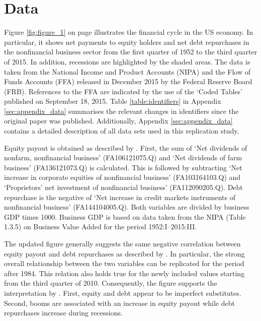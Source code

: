 \section{Data}
\label{sec:data}



Figure \ref{fig:figure_1} on page \pageref{fig:figure_1} illustrates the financial cycle in the US economy. In particular, it shows net payments to equity holders and net debt repurchases in the nonfinancial business sector from the first quarter of 1952 to the third quarter of 2015. In addition, recessions are highlighted by the shaded areas. The data is taken from the National Income and Product Accounts (NIPA) and the Flow of Funds Accounts (FFA) released in December 2015 by the Federal Reserve Board (FRB). References to the FFA are indicated by the use of the ‘Coded Tables’ published on September 18, 2015. Table \ref{table:identifiers} in Appendix \ref{sec:appendix_data} summarises the relevant changes in identifiers since the original paper was published. Additionally, Appendix \ref{sec:appendix_data} contains a detailed description of all data sets used in this replication study.

Equity payout is obtained as described by \citeauthor{JERMANNfinancial}. First, the sum of ‘Net dividends of nonfarm, nonfinancial business’ (FA106121075.Q) and ‘Net dividends of farm business’ (FA136121073.Q) is calculated. This is followed by subtracting ‘Net increase in corporate equities of nonfinancial business’ (FA103164103.Q) and ‘Proprietors' net investment of nonfinancial business’ (FA112090205.Q). Debt repurchase is the negative of ‘Net increase in credit markets instruments of nonfinancial business’ (FA144104005.Q). Both variables are divided by business GDP times 1000. Business GDP is based on data taken from the NIPA (Table 1.3.5) on Business Value Added for the period 1952:I--2015:III.

The updated figure generally suggests the same negative correlation between equity payout and debt repurchases as described by \citeauthor{JERMANNfinancial}. In particular, the strong overall relationship between the two variables can be replicated for the period after 1984. This relation also holds true for the newly included values starting from the third quarter of 2010. Consequently, the figure supports the interpretation by \citeauthor{JERMANNfinancial}. First, equity and debt appear to be imperfect substitutes. Second, booms are associated with an increase in equity payout while debt repurchases increase during recessions.
